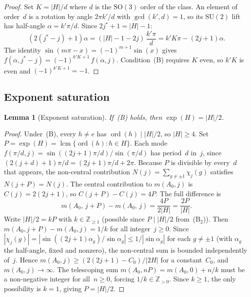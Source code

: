 \documentclass[12pt]{article}
\newtheorem{lemma}[theorem]{Lemma}
\theoremstyle{definition}
\theoremstyle{remark}
\newcommand{\ZZ}{\mathbb{Z}}
\newcommand{\SU}{\mathrm{SU}}
\newcommand{\SO}{\mathrm{SO}}
\DeclareMathOperator{\ord}{ord}
\DeclareMathOperator{\lcm}{lcm}
\begin{document}
\begin{proof}
  Set $K = |H|/d$ where $d$ is the $\SO(3)$ order
  of the class.
  An element of order~$d$
  is a rotation by angle $2\pi k'/d$ with
  $\gcd(k', d) = 1$, so its $\SU(2)$ lift has
  half-angle $\alpha = k'\pi/d$.
  Since $2j^*{+}1 = |H| - 1$:
  \[
    (2(j^*{-}j){+}1)\alpha
    = (|H|{-}1{-}2j)\,\frac{k'\pi}{d}
    = k'K\pi - (2j{+}1)\alpha.
  \]
  The identity
  $\sin(m\pi - x) = (-1)^{m+1}\sin(x)$ gives
  $f(\alpha, j^*{-}j) = (-1)^{k'K+1}\,f(\alpha, j)$.
  Condition~(B) requires $K$ even, so $k'K$ is even
  and $(-1)^{k'K+1} = -1$.
\end{proof}

\subsection{Exponent saturation}
\label{sec:exponent}

\begin{lemma}[Exponent saturation]
  \label{lem:exponent}
  If~\textup{(B)} holds, then $\exp(H) = |H|/2$.
\end{lemma}

\begin{proof}
  Under~(B), every $h \neq e$ has
  $\ord(h) \mid |H|/2$, so $|H| \ge 4$.
  Set $P = \exp(H) = \lcm\{\ord(h) : h \in H\}$.
  Each mode $f(\pi/d, j) = \sin((2j{+}1)\pi/d)/\sin(\pi/d)$
  has period~$d$ in~$j$, since
  $(2(j{+}d){+}1)\pi/d = (2j{+}1)\pi/d + 2\pi$.
  Because $P$ is divisible by every~$d$ that appears, the
  non-central contribution
  $N(j) = \sum_{g \neq \pm 1} \chi_j(g)$
  satisfies $N(j{+}P) = N(j)$.
  The central contribution to $m(A_0, j)$ is
  $C(j) = 2(2j{+}1)$, so $C(j{+}P) - C(j) = 4P$.
  The full difference is
  \[
    m(A_0,\, j{+}P) - m(A_0,\, j)
    = \frac{4P}{2|H|}
    = \frac{2P}{|H|}.
  \]
  Write $|H|/2 = kP$ with $k \in \ZZ_{\ge 1}$
  (possible since $P \mid |H|/2$ from~(B$_2$)).
  Then $m(A_0, j{+}P) - m(A_0, j) = 1/k$ for all
  integer~$j \ge 0$.
  Since $|\chi_j(g)| = |\sin((2j{+}1)\alpha_g)/\sin\alpha_g|
  \le 1/|\sin\alpha_g|$ for each $g \neq \pm 1$
  (with $\alpha_g$ the half-angle, fixed and nonzero),
  the non-central sum is bounded independently of~$j$.
  Hence $m(A_0, j) \ge (2(2j{+}1) - C_0)/|2H|$ for
  a constant~$C_0$, and $m(A_0, j) \to \infty$.
  The telescoping sum
  $m(A_0, nP) = m(A_0, 0) + n/k$ must be a
  non-negative integer for all~$n \ge 0$, forcing
  $1/k \in \ZZ_{>0}$.
  Since $k \ge 1$, the only possibility is $k = 1$,
  giving $P = |H|/2$.
\end{proof}
\end{document}

